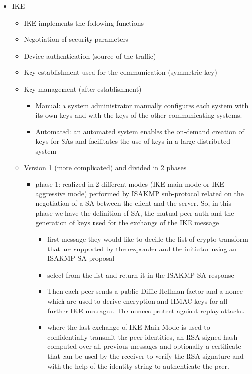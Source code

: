 \documentclass{article}
\begin{document}
\begin{itemize}
\begin{itemize}
    \end{itemize}
    \item IKE
    \begin{itemize}
        \item IKE implements the following functions
        \item Negotiation of security parameters
        \item Device authentication (source of the traffic)
        \item Key establishment used for the communication (symmetric key)
        \item Key management (after establishment)
        \begin{itemize}
            \item Manual: a system administrator manually configures each system with its own keys and with the keys of the other communicating systems.
            \item Automated: an automated system enables the on-demand creation of keys for SAs and facilitates the use of keys in a large distributed system 
        \end{itemize}
        \item Version 1 (more complicated) and divided in 2 phases
        \begin{itemize}
            \item phase 1: realized in 2 different modes (IKE main mode or IKE aggressive mode) performed by ISAKMP sub-protocol related on the negotiation of a SA between the client and the server. So, in this phase we have the definition of SA, the mutual peer auth and the generation of keys used for the exchange of the IKE message
            \begin{itemize}
                \item first message they would like to decide the list of crypto transform that are supported by the responder and the initiator using an ISAKMP SA proposal
                \item select from the list and return it in the ISAKMP SA response
                \item Then each peer sends a public Diffie-Hellman factor and a nonce which are used to derive encryption and HMAC keys for all further IKE messages. The nonces protect against replay attacks.
                \item where the last exchange of IKE Main Mode is used to confidentially transmit the peer identities, an RSA-signed hash computed over all previous messages and optionally a certificate that can be used by the receiver to verify the RSA signature and with the help of the identity string to authenticate the peer.

\end{itemize}
\end{itemize}
\end{itemize}
\end{itemize}
\end{document}
